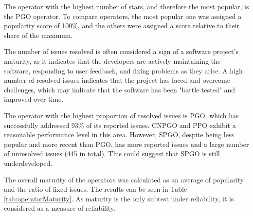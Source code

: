 The operator with the highest number of stars, and therefore the most popular, is the PGO operator. To compare operators, the most popular one was assigned a popularity score of 100\%, and the others were assigned a score relative to their share of the maximum.


The number of issues resolved is often considered a sign of a software project's maturity, as it indicates that the developers are actively maintaining the software, responding to user feedback, and fixing problems as they arise. A high number of resolved issues indicates that the project has faced and overcome challenges, which may indicate that the software has been "battle tested" and improved over time.

The operator with the highest proportion of resolved issues is PGO, which has successfully addressed 93\% of its reported issues. CNPGO and PPO exhibit a reasonable performance level in this area. However, SPGO, despite being less popular and more recent than PGO, has more reported issues and a large number of unresolved issues (445 in total). This could suggest that SPGO is still underdeveloped.


The overall maturity of the operators was calculated as an average of popularity and the ratio of fixed issues. The results can be seen in Table \ref{tab:operatorMaturity}. As maturity is the only subtest under reliability, it is considered as a measure of reliability.


